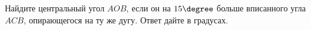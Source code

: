 \begin{ex}
	\begin{condition}
		Найдите центральный угол \( AOB \), если он на \( 15 \degree\)  больше вписанного угла \( ACB \), опирающегося на ту же дугу. Ответ дайте в градусах.
	\end{condition}
\end{ex}